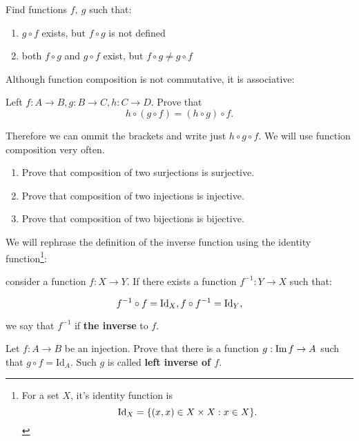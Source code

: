 \begin{exercise}
	Find functions $f,~g$ such that:
	\begin{enumerate}
		\item $g\circ f$ exists, but $f\circ g$ is not defined
		\item both $f\circ g$ and $g\circ f$ exist, but $f\circ g\neq g\circ f$
	\end{enumerate}
\end{exercise}

Although function composition is not commutative, it is associative:

\begin{exercise}
	Left $f:A\to B, g: B\to C, h: C\to D$. Prove that
	$$h\circ (g\circ f) = (h\circ g)\circ f.$$
\end{exercise}
Therefore we can ommit the brackets and write just $h\circ g\circ f.$ We will use function composition very
often.

\begin{exercise}
    \begin{enumerate}
	   \item Prove that composition of two surjections is surjective.
	   \item Prove that composition of two injections is injective.
	   \item Prove that composition of two bijections is bijective.
    \end{enumerate}
\end{exercise}

\begin{definition} We will rephrase the definition of the inverse function using the identity function\footnote{For a set $X$, it's identity function is
    $$\text{Id}_X=\{(x,x)\in X\times X : x\in X\}.$$}:

    consider a function $f:X\to Y$. If there exists a function $f^{-1}:Y\to X$ such that:

    $$f^{-1}\circ f=\text{Id}_X,  f\circ f^{-1}=\text{Id}_Y,$$

    we say that $f^{-1}$ if \textbf{the inverse} to $f$.
\end{definition}

\begin{exercise}
  Let $f: A\to B$ be an injection. Prove that there is a function
  $g: \text{Im\,} f \to A$ such that $g\circ f = \text{Id}_A.$
  Such $g$ is called \textbf{left inverse of $f$}.
\end{exercise}

